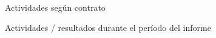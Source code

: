 \documentclass[legalpaper]{informe_insivumeh}
\begin{document}
\maketitle

\begin{countedtable}{Actividades según contrato}
    \rowcontent{}
    \rowcontent{}
    \rowcontent{}
    \rowcontent{}
    \rowcontent{}
    \rowcontent{}
    \rowcontent{}
    \rowcontent{}
\end{countedtable}

\begin{countedtable}{Actividades / resultados durante el período del informe}
    \rowcontent{;)} %
\end{countedtable}

\firmas
\end{document}

